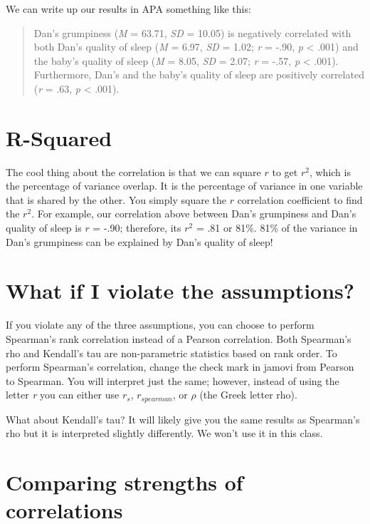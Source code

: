 \documentclass[
]{book}
\begin{document}
We can write up our results in APA something like this:

\begin{quote}
Dan's grumpiness (\emph{M} = 63.71, \emph{SD} = 10.05) is negatively correlated with both Dan's quality of sleep (\emph{M} = 6.97, \emph{SD} = 1.02; \emph{r} = -.90, \emph{p} \textless{} .001) and the baby's quality of sleep (\emph{M} = 8.05, \emph{SD} = 2.07; \emph{r} = -.57, \emph{p} \textless{} .001). Furthermore, Dan's and the baby's quality of sleep are positively correlated (\emph{r} = .63, \emph{p} \textless{} .001).
\end{quote}

\hypertarget{r-squared}{%
\section{R-Squared}\label{r-squared}}

The cool thing about the correlation is that we can square \(r\) to get \(r^2\), which is the percentage of variance overlap. It is the percentage of variance in one variable that is shared by the other. You simply square the \(r\) correlation coefficient to find the \(r^2\). For example, our correlation above between Dan's grumpiness and Dan's quality of sleep is \(r\) = -.90; therefore, its \(r^2\) = .81 or 81\%. 81\% of the variance in Dan's grumpiness can be explained by Dan's quality of sleep!

\hypertarget{what-if-i-violate-the-assumptions}{%
\section{What if I violate the assumptions?}\label{what-if-i-violate-the-assumptions}}

If you violate any of the three assumptions, you can choose to perform Spearman's rank correlation instead of a Pearson correlation. Both Spearman's rho and Kendall's tau are non-parametric statistics based on rank order. To perform Spearman's correlation, change the check mark in jamovi from Pearson to Spearman. You will interpret just the same; however, instead of using the letter \emph{r} you can either use \(r_s\), \(r_{spearman}\), or \(\rho\) (the Greek letter rho).

What about Kendall's tau? It will likely give you the same results as Spearman's rho but it is interpreted slightly differently. We won't use it in this class.

\hypertarget{comparing-strengths-of-correlations}{%
\section{Comparing strengths of correlations}\label{comparing-strengths-of-correlations}}
\end{document}
